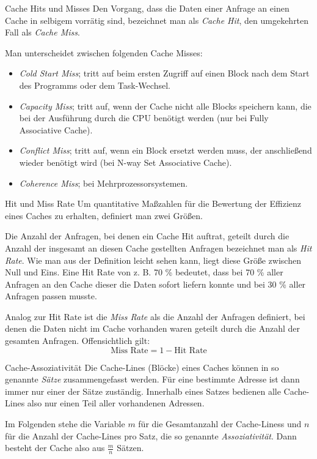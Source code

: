 \begin{defi}{Cache Hits und Misses}
    Den Vorgang, dass die Daten einer Anfrage an einen Cache in selbigem vorrätig sind, bezeichnet man als \emph{Cache Hit}, den umgekehrten Fall als \emph{Cache Miss}.
    
    Man unterscheidet zwischen folgenden Cache Misses:
    \begin{itemize}
        \item \emph{Cold Start Miss}; tritt auf beim ersten Zugriff auf einen Block nach dem Start des Programms oder dem Task-Wechsel.
        \item \emph{Capacity Miss}; tritt auf, wenn der Cache nicht alle Blocks speichern kann, die bei der Ausführung durch die CPU benötigt werden (nur bei Fully Associative Cache).
        \item \emph{Conflict Miss}; tritt auf, wenn ein Block ersetzt werden muss, der anschließend wieder benötigt wird (bei N-way Set Associative Cache).
        \item \emph{Coherence Miss}; bei Mehrprozessorsystemen.
    \end{itemize}
\end{defi}

\begin{defi}{Hit und Miss Rate}
    Um quantitative Maßzahlen für die Bewertung der Effizienz eines Caches zu erhalten, definiert man zwei Größen.
    
    Die Anzahl der Anfragen, bei denen ein Cache Hit auftrat, geteilt durch die Anzahl der insgesamt an diesen Cache gestellten Anfragen bezeichnet man als \emph{Hit Rate}.
    Wie man aus der Definition leicht sehen kann, liegt diese Größe zwischen Null und Eins. Eine Hit Rate von z. B. 70 \% bedeutet, dass bei 70 \% aller Anfragen an den Cache dieser die Daten sofort liefern konnte und bei 30 \% aller Anfragen passen musste.
    
    Analog zur Hit Rate ist die \emph{Miss Rate} als die Anzahl der Anfragen definiert, bei denen die Daten nicht im Cache vorhanden waren geteilt durch die Anzahl der gesamten Anfragen.
    Offensichtlich gilt:
    \[
        \text{Miss Rate} = 1 - \text{Hit Rate}
    \]
\end{defi}

\begin{defi}{Cache-Assoziativität}
    Die Cache-Lines (Blöcke) eines Caches können in so genannte \emph{Sätze} zusammengefasst werden.
    Für eine bestimmte Adresse ist dann immer nur einer der Sätze zuständig.
    Innerhalb eines Satzes bedienen alle Cache-Lines also nur einen Teil aller vorhandenen Adressen.
    
    Im Folgenden stehe die Variable $m$ für die Gesamtanzahl der Cache-Liness und $n$ für die Anzahl der Cache-Lines pro Satz, die so genannte \emph{Assoziativität}.
    Dann besteht der Cache also aus $\frac{m}{n}$ Sätzen.
\end{defi}


